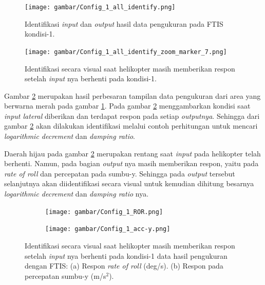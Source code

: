 \begin{figure}[H]
	\centering
	\texttt{[image: gambar/Config\_1\_all\_identify.png]}
	\caption{Identifikasi \textit{input} dan \textit{output} hasil data pengukuran pada FTIS kondisi-1.}
	\label{fig:condition_1_identify}
\end{figure}

\begin{figure}[H]
	\centering
	\texttt{[image: gambar/Config\_1\_all\_identify\_zoom\_marker\_7.png]}
	\caption{Identifikasi secara visual saat helikopter masih memberikan respon setelah \textit{input} nya berhenti pada kondisi-1.}
	\label{fig:condition_1_identify_calc}
\end{figure}

Gambar \ref{fig:condition_1_identify_calc} merupakan hasil perbesaran tampilan data pengukuran dari area yang berwarna merah pada gambar \ref{fig:condition_1_identify}. Pada gambar \ref{fig:condition_1_identify_calc} menggambarkan kondisi saat \textit{input lateral} diberikan dan terdapat respon pada setiap \textit{outputnya}. Sehingga dari gambar \ref{fig:condition_1_identify_calc} akan dilakukan identifikasi melalui contoh perhitungan untuk mencari \textit{logarithmic decrement} dan \textit{damping ratio}.

Daerah hijau pada gambar \ref{fig:condition_1_identify_calc} merupakan rentang saat \textit{input} pada helikopter telah berhenti. Namun, pada bagian \textit{output} nya masih memberikan respon, yaitu pada \textit{rate of roll} dan percepatan pada sumbu-y. Sehingga pada \textit{output} tersebut selanjutnya akan diidentifikasi secara visual untuk kemudian dihitung besarnya \textit{logarithmic decrement} dan \textit{damping ratio} nya.

\begin{figure}[H]
	\centering 
	\begin{subfigure}{0.48\textwidth}
		\centering
		\texttt{[image: gambar/Config\_1\_ROR.png]}
		\caption{}
		\label{fig:condition_1_ROR}
	\end{subfigure}
	\centering
	\begin{subfigure}{0.48\textwidth}
		\centering
		\texttt{[image: gambar/Config\_1\_acc-y.png]}
		\caption{}
		\label{fig:condition_1_acc-y}	
	\end{subfigure}
	\caption{Identifikasi secara visual saat helikopter masih memberikan respon setelah \textit{input} nya berhenti pada kondisi-1 data hasil pengukuran dengan FTIS: (a) Respon \textit{rate of roll} (deg/s). (b) Respon pada percepatan sumbu-y (m/s$^2$).}
	\label{fig:identifikasi_config1}
\end{figure}

